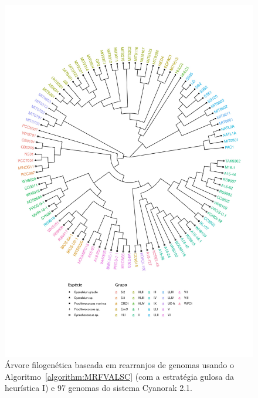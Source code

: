 \begin{figure}[!p]
    \centering
    \includegraphics[width=.99\textwidth]{figures/REHDYXMS}
    \caption{Árvore filogenética baseada em rearranjos de genomas usando o Algoritmo~\ref{algorithm:MRFVALSC} (com a estratégia gulosa da heurística I) e 97 genomas do sistema Cyanorak 2.1.} 
    \label{figure:REHDYXMS}
\end{figure}